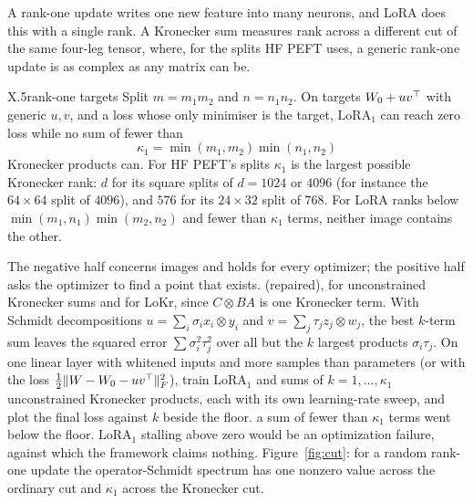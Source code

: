 A rank-one update writes one new feature into many neurons, and LoRA does this with a single rank. A Kronecker sum
measures rank across a different cut of the same four-leg tensor, where, for the splits HF PEFT uses, a generic rank-one
update is as complex as any matrix can be.

\begin{prediction}{X.5}{rank-one targets}
Split $m=m_1m_2$ and $n=n_1n_2$. On targets $W_0+uv^{\top}$ with generic $u,v$, and a loss whose only minimiser is the
target, $\mathrm{LoRA}_1$ can reach zero loss while no sum of fewer than
\begin{equation}\label{eq:pred-kappa}
  \kappa_1=\min(m_1,m_2)\min(n_1,n_2)
\end{equation}
Kronecker products can. For HF PEFT's splits $\kappa_1$ is the largest possible Kronecker rank: $d$ for its square
splits of $d=1024$ or $4096$ (for instance the $64\times64$ split of $4096$), and $576$ for its $24\times32$ split of
$768$. For LoRA ranks below $\min(m_1,n_1)\min(m_2,n_2)$ and fewer than $\kappa_1$ terms, neither image contains the
other.
\begin{predmeta}
   The negative half concerns images and holds for every optimizer; the positive half asks the
    optimizer to find a point that exists.
    (repaired), for unconstrained Kronecker sums and for LoKr, since $C\otimes
    BA$ is one Kronecker term. With Schmidt decompositions $u=\sum_i\sigma_ix_i\otimes y_i$ and
    $v=\sum_j\tau_jz_j\otimes w_j$, the best $k$-term sum leaves the squared error $\sum\sigma_i^2\tau_j^2$ over all but
    the $k$ largest products $\sigma_i\tau_j$.
   On one linear layer with whitened inputs and more samples than parameters (or with the loss
    $\tfrac12\lVert W-W_0-uv^{\top}\rVert_F^2$), train $\mathrm{LoRA}_1$ and sums of $k=1,\dots,\kappa_1$ unconstrained
    Kronecker products, each with its own learning-rate sweep, and plot the final loss against $k$ beside the floor.
   a sum of fewer than $\kappa_1$ terms went below the floor. $\mathrm{LoRA}_1$ stalling above
    zero would be an optimization failure, against which the framework claims nothing.
   Figure~\ref{fig:cut}: for a random rank-one update the operator-Schmidt spectrum has one nonzero value
    across the ordinary cut and $\kappa_1$ across the Kronecker cut.
\end{predmeta}
\end{prediction}


